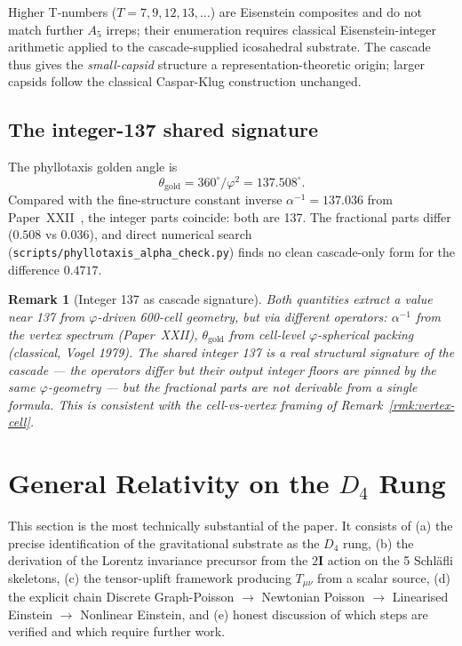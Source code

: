 \documentclass[12pt]{article}
\newtheorem{remark}[theorem]{Remark}
\newcommand{\twoI}{2\mathbf{I}}
\begin{document}
Higher T-numbers ($T = 7, 9, 12, 13, \ldots$) are Eisenstein composites and do not match further $A_5$ irreps; their enumeration requires classical Eisenstein-integer arithmetic applied to the cascade-supplied icosahedral substrate. The cascade thus gives the \emph{small-capsid} structure a representation-theoretic origin; larger capsids follow the classical Caspar-Klug construction unchanged.

\subsection{The integer-137 shared signature}\label{sec:bio:phyllotaxis}

The phyllotaxis golden angle is
\[
\theta_{\mathrm{gold}} = 360^\circ / \varphi^2 = 137.508^\circ.
\]
Compared with the fine-structure constant inverse $\alpha^{-1} = 137.036$ from Paper~XXII~\citep{SmartXXII}, the integer parts coincide: both are 137. The fractional parts differ ($0.508$ vs $0.036$), and direct numerical search (\texttt{scripts/phyllotaxis\_alpha\_check.py}) finds no clean cascade-only form for the difference $0.4717$.

\begin{remark}[Integer 137 as cascade signature]\label{rmk:137}
Both quantities extract a value near 137 from $\varphi$-driven 600-cell geometry, but via different operators: $\alpha^{-1}$ from the vertex spectrum (Paper~XXII), $\theta_{\mathrm{gold}}$ from cell-level $\varphi$-spherical packing (classical, Vogel 1979). The shared integer 137 is a real structural signature of the cascade --- the operators differ but their output integer floors are pinned by the same $\varphi$-geometry --- but the fractional parts are not derivable from a single formula. This is consistent with the cell-vs-vertex framing of Remark~\ref{rmk:vertex-cell}.
\end{remark}

\section{General Relativity on the $D_4$ Rung}\label{sec:gr}

This section is the most technically substantial of the paper. It consists of (a) the precise identification of the gravitational substrate as the $D_4$ rung, (b) the derivation of the Lorentz invariance precursor from the $\twoI$ action on the 5 Schl\"afli skeletons, (c) the tensor-uplift framework producing $T_{\mu\nu}$ from a scalar source, (d) the explicit chain Discrete Graph-Poisson $\to$ Newtonian Poisson $\to$ Linearised Einstein $\to$ Nonlinear Einstein, and (e) honest discussion of which steps are verified and which require further work.
\end{document}
